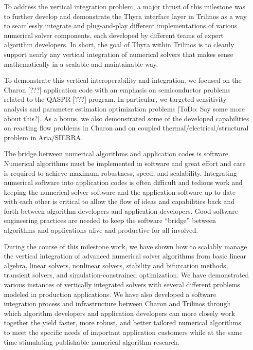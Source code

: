 \documentclass[pdf,ps2pdf,11pt]{SANDreport}
\begin{document}
To address the vertical integration problem, a major thrust of this milestone
was to further develop and demonstrate the Thyra interface layer in Trilinos
as a way to seamlessly integrate and plug-and-play different implementations of
various numerical solver components, each developed by different teams of
expert algorithm developers.  In short, the goal of Thyra within Trilinos is
to cleanly support nearly any vertical integration of numerical solvers that
makes sense mathematically in a scalable and maintainable way.

To demonstrate this vertical interoperability and integration, we focused on
the Charon [???] application code with an emphasis on semiconductor problems
related to the QASPR [???] program.  In particular, we targeted sensitivity
analysis and parameter estimation optimization problems [ToDo: Say some more
about this?].  As a bonus, we also demonstrated some of the developed
capabilities on reacting flow problems in Charon and on coupled 
thermal/electrical/structural problem in Aria/SIERRA.

The bridge between numerical algorithms and application codes is software.
Numerical algorithms must be implemented in software and great effort and care
is required to achieve maximum robustness, speed, and scalability.
Integrating numerical software into application codes is often difficult and
tedious work and keeping the numerical solver software and the application
software up to date with each other is critical to allow the flow of ideas and
capabilities back and forth between algorithm developers and application
developers.  Good software engineering practices are needed to keep the
software ``bridge'' between algorithms and applications alive and productive
for all involved.

During the course of this milestone work, we have shown how to scalably manage
the vertical integration of advanced numerical solver algorithms from basic
linear algebra, linear solvers, nonlinear solvers, stability and bifurcation
methods, transient solvers, and simulation-constrained optimization.  We have
demonstrated various instances of vertically integrated solvers with several
different problems modeled in production applications.  We have also developed
a software integration process and infrastructure between Charon and Trilinos
through which algorithm developers and application developers can more closely
work together the yield faster, more robust, and better tailored numerical
algorithms to meet the specific needs of important application customers while
at the same time stimulating publishable numerical algorithm research.
\end{document}

